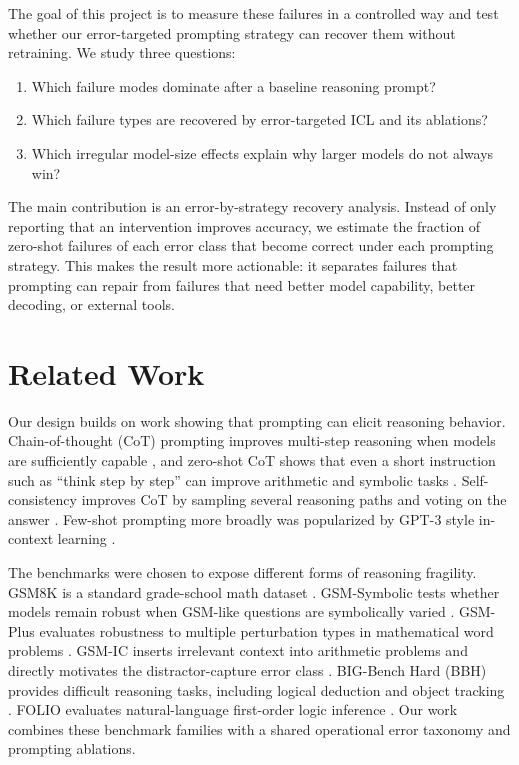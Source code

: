 \documentclass[10pt,twocolumn]{article}
\begin{document}
The goal of this project is to measure these failures in a controlled way and test whether our error-targeted prompting strategy can recover them without retraining. We study three questions:
\begin{enumerate}
    \item Which failure modes dominate after a baseline reasoning prompt?
    \item Which failure types are recovered by error-targeted ICL and its ablations?
    \item Which irregular model-size effects explain why larger models do not always win?
\end{enumerate}

The main contribution is an error-by-strategy recovery analysis. Instead of only reporting that an intervention improves accuracy, we estimate the fraction of zero-shot failures of each error class that become correct under each prompting strategy. This makes the result more actionable: it separates failures that prompting can repair from failures that need better model capability, better decoding, or external tools.

\section{Related Work}
Our design builds on work showing that prompting can elicit reasoning behavior. Chain-of-thought (CoT) prompting improves multi-step reasoning when models are sufficiently capable \cite{wei2022cot}, and zero-shot CoT shows that even a short instruction such as ``think step by step'' can improve arithmetic and symbolic tasks \cite{kojima2022zeroshot}. Self-consistency improves CoT by sampling several reasoning paths and voting on the answer \cite{wang2022selfconsistency}. Few-shot prompting more broadly was popularized by GPT-3 style in-context learning \cite{brown2020gpt3}.

The benchmarks were chosen to expose different forms of reasoning fragility. GSM8K is a standard grade-school math dataset \cite{cobbe2021gsm8k}. GSM-Symbolic tests whether models remain robust when GSM-like questions are symbolically varied \cite{mirzadeh2024gsmsymbolic}. GSM-Plus evaluates robustness to multiple perturbation types in mathematical word problems \cite{li2024gsmplus}. GSM-IC inserts irrelevant context into arithmetic problems and directly motivates the distractor-capture error class \cite{shi2023gsmic}. BIG-Bench Hard (BBH) provides difficult reasoning tasks, including logical deduction and object tracking \cite{suzgun2023bbh}. FOLIO evaluates natural-language first-order logic inference \cite{han2022folio}. Our work combines these benchmark families with a shared operational error taxonomy and prompting ablations.
\end{document}

